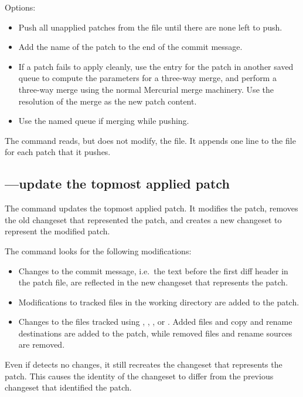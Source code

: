 Options:
\begin{itemize}
\item[\hgxopt{mq}{qpush}{-a}] Push all unapplied patches from the
   file until there are none left to push.
\item[\hgxopt{mq}{qpush}{-l}] Add the name of the patch to the end
  of the commit message.
\item[\hgxopt{mq}{qpush}{-m}] If a patch fails to apply cleanly, use the
  entry for the patch in another saved queue to compute the parameters
  for a three-way merge, and perform a three-way merge using the
  normal Mercurial merge machinery.  Use the resolution of the merge
  as the new patch content.
\item[\hgxopt{mq}{qpush}{-n}] Use the named queue if merging while pushing.
\end{itemize}

The  command reads, but does not modify, the
 file.  It appends one line to the 
file for each patch that it pushes.

\subsection{---update the topmost applied patch}

The  command updates the topmost applied patch.  It
modifies the patch, removes the old changeset that represented the
patch, and creates a new changeset to represent the modified patch.

The  command looks for the following modifications:
\begin{itemize}
\item Changes to the commit message, i.e.~the text before the first
  diff header in the patch file, are reflected in the new changeset
  that represents the patch.
\item Modifications to tracked files in the working directory are
  added to the patch.
\item Changes to the files tracked using , ,
  , or .  Added files and copy and rename
  destinations are added to the patch, while removed files and rename
  sources are removed.
\end{itemize}

Even if  detects no changes, it still recreates the
changeset that represents the patch.  This causes the identity of the
changeset to differ from the previous changeset that identified the
patch.

